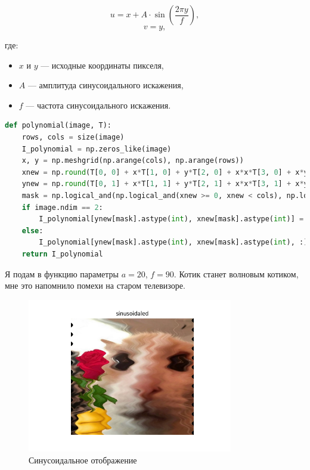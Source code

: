 \documentclass[a4paper,12pt]{article}
\begin{document}
\[
u = x + A \cdot \sin\left(\frac{2 \pi y}{f}\right),
\]
\[
v = y,
\]

где:
\begin{itemize}
    \item \(x\) и \(y\) — исходные координаты пикселя,
    \item \(A\) — амплитуда синусоидального искажения,
    \item \(f\) — частота синусоидального искажения.
\end{itemize}



\begin{lstlisting}[language=Python, caption=Функция синусоидального отображения]
def polynomial(image, T):
    rows, cols = size(image)
    I_polynomial = np.zeros_like(image)
    x, y = np.meshgrid(np.arange(cols), np.arange(rows))
    xnew = np.round(T[0, 0] + x*T[1, 0] + y*T[2, 0] + x*x*T[3, 0] + x*y*T[4, 0] + y*y*T[5, 0]).astype(np.float32)
    ynew = np.round(T[0, 1] + x*T[1, 1] + y*T[2, 1] + x*x*T[3, 1] + x*y*T[4, 1] + y*y*T[5, 1]).astype(np.float32)
    mask = np.logical_and(np.logical_and(xnew >= 0, xnew < cols), np.logical_and(ynew >= 0, ynew < rows))
    if image.ndim == 2:
        I_polynomial[ynew[mask].astype(int), xnew[mask].astype(int)] = image[y[mask], x[mask]]
    else:
        I_polynomial[ynew[mask].astype(int), xnew[mask].astype(int), :] = image[y[mask], x[mask], :]
    return I_polynomial
\end{lstlisting}

Я подам в функцию параметры \(a = 20\), \(f = 90\). Котик станет волновым котиком, мне это напомнило помехи на старом телевизоре.

\begin{figure}[H]
    \centering
    \includegraphics[width=0.8\textwidth]{lab2/task1/Figure_12.png}
    \caption{Синусоидальное отображение}
    \label{fig:my_image}
\end{figure}
\end{document}
